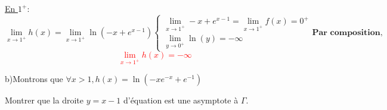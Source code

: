 \documentclass[12pt]{article}
\begin{document}
\underline{En $1^{+}$}:
\begin{equation*}
\lim_{x \to 1^{+}}h(x)=\lim_{x \to 1^{+}}\ln(-x+e^{x-1})
\begin{cases}
\lim_{x \to 1^{+}} -x+e^{x-1}=\lim_{x \to 1^{+}}f(x)=0^{+}\\
\lim_{y \to 0^{+}}\ln(y)=-\infty
\end{cases}
\textbf{Par composition,}
\end{equation*}
\textcolor{red}{\[\lim_{x \to 1^{+}}h(x)=-\infty\]}

b)Montrons que $\forall x>1, h(x)=\ln(-xe^{-x}+e^{-1}) $ 


Montrer que la droite $y=x-1$ d’équation est une asymptote à $\Gamma$.
\end{document}
